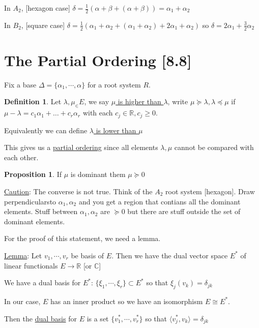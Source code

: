 \documentclass{article}
\theoremstyle{definition}
\newtheorem{definition}{Definition}
\newtheorem{proposition}{Proposition}
\begin{document}
In \(A_2\), [hexagon case] \(\delta = \frac{1}{2}(\alpha + \beta + (\alpha + \beta )) =  \alpha_1 + \alpha_2\) 

In \(B_2\), [square case] \(\delta =\frac{1}{2}(\alpha _1 + \alpha_2 + (\alpha_1 + \alpha_2) + 2\alpha_1 + \alpha_2)\) so \(\delta  = 2\alpha _1 + \frac{3}{2}\alpha_2\) 

\section*{The Partial Ordering [8.8]}

Fix a base \(\Delta = \{ \alpha _1, \cdots, \alpha \} \) for a root system \(R\).

\begin{definition}
    Let \(\lambda,\mu_\in E\), we say \underline{\(\mu\) is higher than \(\lambda\)}, write \(\mu \succeq \lambda, \lambda \preceq\mu\) if \(\mu - \lambda = c_1 \alpha_1 + \dots + c_r \alpha_r\) with each \(c_j\in \mathbb{R} , c_j \geq 0\).  
\end{definition}

Equivalently we can define \underline{\(\lambda\) is lower than \(\mu\) }

This gives us a \underline{partial ordering} since all elements \(\lambda,\mu\) cannot be compared with each other.

\begin{proposition}
    If \(\mu\) is dominant them \(\mu \succeq 0\) 
\end{proposition}

\underline{Caution}: The converse is not true. Think of the \(A_2\) root system [hexagon]. Draw perpendicularsto \(\alpha_1, \alpha_2\) and you get a region that contians all the dominant elements. Stuff between \(\alpha_1, \alpha_2\) are \(\succeq 0\) but there are stuff outside the set of dominant elements.

For the proof of this statement, we need a lemma.

\underline{Lemma}: Let \(v_1,\cdots, v_r\) be basis of \(E\). Then we have the dual vector space \(E^{\ast}\) of linear functionals \(E \to \mathbb{R} \) [or \(\mathbb{C}\)]

We have a dual basis for \(E^{\ast}\): \(\{ \xi_1, \cdots, \xi_r \} \subset E^{\ast} \)  so that \(\xi_j(v_k)=\delta_{jk}\) 

In our case, \(E\) has an inner product so we have an isomorphism \(E \cong E^{\ast}\).

Then the \underline{dual basis} for \(E\) is a set \(\{v_1^{\ast} , \cdots, v_r ^{\ast}\}\) so that \(\langle v_j^{\ast} ,v_k \rangle = \delta_{jk}\) 
\end{document}
